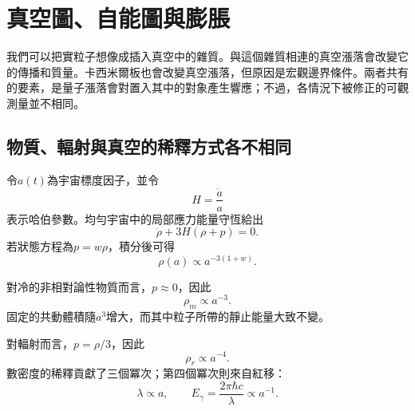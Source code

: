 \section{真空圖、自能圖與膨脹}

\begin{classroomqa}
\end{classroomqa}

我們可以把實粒子想像成插入真空中的雜質。與這個雜質相連的真空漲落會改變它的傳播和質量。卡西米爾板也會改變真空漲落，但原因是宏觀邊界條件。兩者共有的要素，是量子漲落會對置入其中的對象產生響應；不過，各情況下被修正的可觀測量並不相同。

\vspace{-2pt}
\subsection{物質、輻射與真空的稀釋方式各不相同}

令\(a(t)\)為宇宙標度因子，並令
\begin{equation}
H=\frac{\dot a}{a}
\end{equation}
表示哈伯參數。均勻宇宙中的局部應力能量守恆給出
\begin{equation}
\dot\rho+3H(\rho+p)=0.
\end{equation}
若狀態方程為\(p=w\rho\)，積分後可得
\begin{equation}
\rho(a)\propto a^{-3(1+w)}.
\end{equation}

對冷的非相對論性物質而言，\(p\approx0\)，因此
\begin{equation}
\rho_m\propto a^{-3}.
\end{equation}
固定的共動體積隨\(a^3\)增大，而其中粒子所帶的靜止能量大致不變。

對輻射而言，\(p=\rho/3\)，因此
\begin{equation}
\rho_r\propto a^{-4}.
\end{equation}
數密度的稀釋貢獻了三個冪次；第四個冪次則來自紅移：
\begin{equation}
\lambda\propto a,
\qquad
E_\gamma=\frac{2\pi\hbar c}{\lambda}\propto a^{-1}.
\end{equation}

